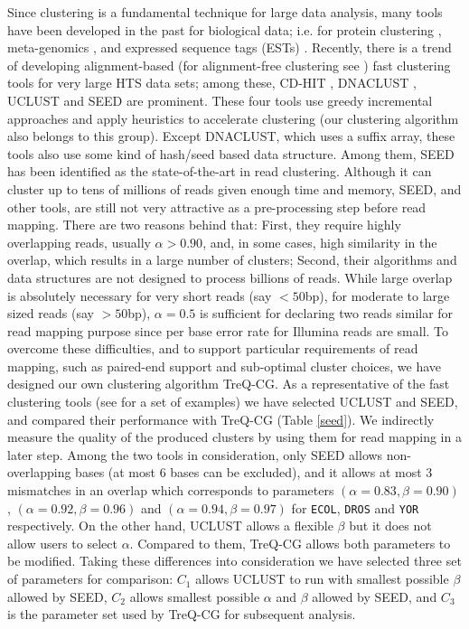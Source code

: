 \documentclass[a4paper]{article}
\begin{document}
Since clustering is a fundamental technique for large data analysis,
many tools have been developed in the past for biological data; i.e.
for protein clustering \cite{Pipenbacher01102002,Loewenstein01072008,Li01072006},
meta-genomics \cite{20388221,10.1371/journal.pone.0003042,10.1371/journal.pbio.0050016,10.1371/journal.pone.0003375},
and expressed sequence tags
(ESTs) \cite{Pertea22032003,Burke01111999,16026600,Hazelhurst15122011}.
Recently, there is a trend of developing alignment-based (for alignment-free clustering see \cite{24011402})
fast clustering tools for very large HTS data sets;
among these, CD-HIT \cite{Fu01122012}, DNACLUST \cite{21718538}, UCLUST \cite{Edgar01102010}
and SEED \cite{Bao:2011ia} are prominent. These four tools
use greedy incremental approaches and apply heuristics to accelerate
clustering (our clustering algorithm also belongs to this group).
Except DNACLUST, which uses a suffix array, these tools also use
some kind of hash/seed based data structure.
Among them, SEED \cite{Bao:2011ia} has been identified as the
state-of-the-art in read clustering. Although it can cluster
up to tens of millions of reads given enough time and memory,
SEED, and other tools, are still not very attractive as a pre-processing
step before read mapping.
There are two reasons behind that: First, they require highly
overlapping reads, usually $\alpha > 0.90$, and, in some cases, high
similarity in the overlap, which results in a large number of clusters;
Second, their
algorithms and data structures are not designed to process billions of
reads.
While large overlap is absolutely necessary for very short reads
(say $< 50$bp), for moderate to large sized reads (say $ > 50$bp),
$\alpha=0.5$ is
sufficient for declaring two reads similar for read mapping purpose
since per base error rate for Illumina reads are small.
To overcome these difficulties, and to support particular
requirements of read mapping, such as paired-end support and sub-optimal
cluster choices, we have designed our own clustering algorithm TreQ-CG.
As a representative of the fast clustering tools (see \cite{Li:2012cq}
for a set of examples) we have selected UCLUST
and SEED, and compared their performance with
TreQ-CG (Table \ref{seed}). We indirectly
measure the quality of the produced
clusters by using them for read mapping in a later step.
Among the two tools in consideration, only SEED allows non-overlapping
bases (at most 6 bases can be excluded), and it allows at
most 3 mismatches in an overlap which corresponds to
parameters
$(\alpha=0.83,\beta=0.90)$,
$(\alpha=0.92,\beta=0.96)$ and
$(\alpha=0.94,\beta=0.97)$ for {\tt ECOL}, {\tt DROS} and
{\tt YOR} respectively.
On the other hand, UCLUST allows a flexible $\beta$ but it does not
allow users to select $\alpha$. Compared to them, TreQ-CG allows both
parameters to be modified. Taking these differences into consideration
we have selected three set of parameters for comparison:
$C_1$ allows UCLUST to run with smallest possible $\beta$ allowed by SEED,
$C_2$ allows smallest possible $\alpha$ and $\beta$ allowed by SEED, and
$C_3$ is the parameter set used by TreQ-CG for subsequent analysis.
\end{document}
